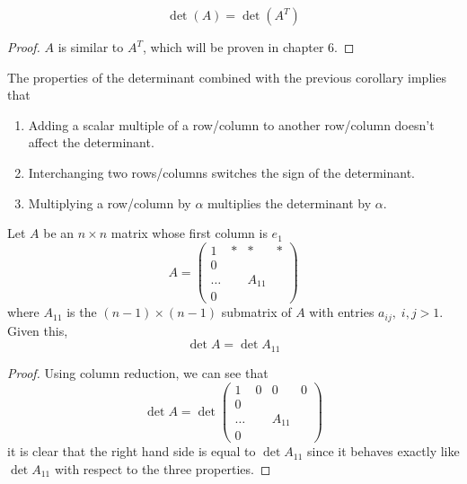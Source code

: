   \begin{corollary}
    \begin{equation}
      \det{(A)} = \det{(A^T)}
    \end{equation}
  \end{corollary}
  \begin{proof}
    $A$ is similar to $A^T$, which will be proven in chapter 6. 
  \end{proof}

  \begin{theorem}
    The properties of the determinant combined with the previous corollary implies that 
    \begin{enumerate}
      \item Adding a scalar multiple of a row/column to another row/column doesn't affect the determinant. 
      \item Interchanging two rows/columns switches the sign of the determinant. 
      \item Multiplying a row/column by $\alpha$ multiplies the determinant by $\alpha$. 
    \end{enumerate}
  \end{theorem}

  \begin{theorem}
    Let $A$ be an $n \times n$ matrix whose first column is $e_1$
    \begin{equation}
      A = \begin{pmatrix}
      1&*&*&* \\
      0 &&& \\
      \ldots& & A_{11}& \\
      0&&&
      \end{pmatrix}
    \end{equation}
    where $A_{11}$ is the $(n-1) \times (n-1)$ submatrix of $A$ with entries $a_{i j}, \; i, j > 1$. Given this, 
    \begin{equation}
      \det{A} = \det{A_{11}}
    \end{equation}
  \end{theorem}
  \begin{proof}
    Using column reduction, we can see that 
    \begin{equation}
      \det{A} = \det{\begin{pmatrix}
      1&0&0&0 \\
      0 &&& \\
      \ldots& & A_{11}& \\
      0&&&
      \end{pmatrix}}
    \end{equation}
    it is clear that the right hand side is equal to $\det{A_{11}}$ since it behaves exactly like $\det{A_{11}}$ with respect to the three properties. 
  \end{proof}

